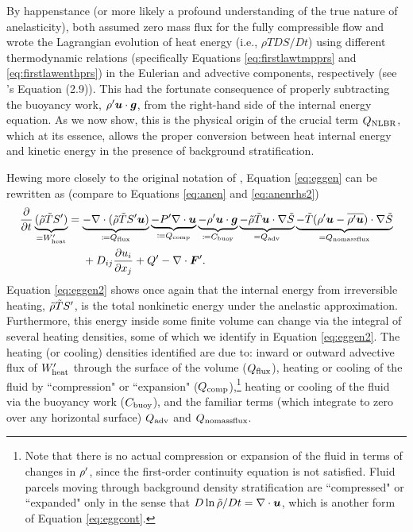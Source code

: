 \documentclass[12pt]{article}
\newcommand{\vecf}{\bm{F}}
\newcommand{\heatnlbr}{Q_{\rm NLBR}}
\newcommand{\heatnomassflux}{Q_{\rm nomassflux}}
\newcommand{\heatadv}{Q_{\rm adv}}
\newcommand{\heatcomp}{Q_{\rm comp}}
\newcommand{\heatbuoy}{C_{\rm buoy}}
\newcommand{\heatfluxin}{Q_{\rm flux}}
\newcommand{\wpheat}{W^\prime_{\rm heat}}
\begin{document}
By happenstance (or more likely a profound understanding of the true nature of anelasticity), \citet{Gough1969} both assumed zero mass flux for the fully compressible flow and wrote the Lagrangian evolution of heat energy (i.e., $\rho T DS/Dt$) using different thermodynamic relations (specifically Equations \eqref{eq:firstlawtmpprs} and \eqref{eq:firstlawenthprs}) in the Eulerian and advective components, respectively (see \citet{Gough1969}'s Equation (2.9)). This had the fortunate consequence of properly subtracting the buoyancy work, ${\rho^\prime} \bm{u}\cdot \bm{g}$, from the right-hand side of the internal energy equation. As we now show, this is the physical origin of the crucial term $\heatnlbr$, which at its essence, allows the proper conversion between heat internal energy and kinetic energy in the presence of background stratification. 

Hewing more closely to the original notation of \citet{Gough1969}, Equation \eqref{eq:eggen} can be rewritten as (compare to Equations \eqref{eq:anen} and \eqref{eq:anenrhs2})
\begin{align}\label{eq:eggen2}
\pderiv{}{t}\underbrace{(\rhotilde\tmptilde\entrprime)}_{=\wpheat} &=\underbrace{-\Div(\rhotilde\tmptilde \entrprime\vecu)}_{\define\heatfluxin} \underbrace{-\prsprime\Div\vecu}_{\define\heatcomp} \underbrace{-\rhoprime \vecu\cdot \vecg}_{\define\heatbuoy}  \underbrace{- \rhotilde\tmptilde \ugrad \entrtilde}_{=\heatadv}\underbrace{- \tmptilde(\rhoprime \vecu-\overline{\rhoprime\vecu})\cdot\nabla\entrtilde}_{=\heatnomassflux}\nonumber\\
&\ \ \ \ +D_{ij}\pderiv{u_i}{x_j} + Q^\prime- \Div\vecf^\prime.
\end{align}
Equation \eqref{eq:eggen2} shows once again that the internal energy from irreversible heating, $\tilde{\rho}\tilde{T} {S^\prime}$, is the total nonkinetic energy under the anelastic approximation. Furthermore, this energy inside some finite volume can change via the integral of several heating densities, some of which we identify in Equation \eqref{eq:eggen2}. The heating (or cooling) densities identified are due to: inward or outward advective flux of $\wpheat$ through the surface of the volume ($\heatfluxin$), heating or cooling of the fluid by ``compression" or ``expansion" ($\heatcomp$),\footnote{Note that there is no actual compression or expansion of the fluid in terms of changes in ${\rho^\prime}$, since the first-order continuity equation is not satisfied. Fluid parcels moving through background density stratification are ``compressed" or ``expanded" only in the sense that $D\ln{\tilde{\rho}}/Dt=\nabla\cdot\bm{u}$, which is another form of Equation \eqref{eq:eggcont}.} heating or cooling of the fluid via the buoyancy work ($\heatbuoy$), and the familiar terms (which integrate to zero over any horizontal surface) $\heatadv$ and $\heatnomassflux$.
\end{document}
